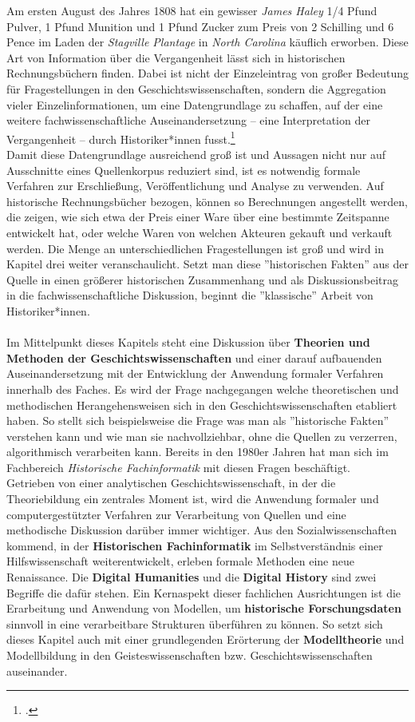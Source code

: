 \documentclass[12pt,a4paper]{article}
\begin{document}
Am ersten August des Jahres 1808 hat ein gewisser \textit{James Haley} 1/4 Pfund Pulver, 1 Pfund Munition und 1 Pfund Zucker zum Preis von 2 Schilling und 6 Pence im Laden der \textit{Stagville Plantage} in \textit{North Carolina} käuflich erworben. Diese Art von Information über die Vergangenheit lässt sich in historischen Rechnungsbüchern finden. Dabei ist nicht der Einzeleintrag von großer Bedeutung für Fragestellungen in den Geschichtswissenschaften, sondern die Aggregation vieler Einzelinformationen, um eine Datengrundlage zu schaffen, auf der eine weitere fachwissenschaftliche Auseinandersetzung -- eine Interpretation der Vergangenheit -- durch Historiker*innen fusst.\footcite[][06.06.2019]{vogeler2015mittelalterliche}
\\
Damit diese Datengrundlage ausreichend groß ist und Aussagen nicht nur auf Ausschnitte eines Quellenkorpus reduziert sind, ist es notwendig formale Verfahren zur Erschließung, Veröffentlichung und Analyse zu verwenden. Auf historische Rechnungsbücher bezogen, können so Berechnungen angestellt werden, die zeigen, wie sich etwa der Preis einer Ware über eine bestimmte Zeitspanne entwickelt hat, oder welche Waren von welchen Akteuren gekauft und verkauft werden. Die Menge an unterschiedlichen Fragestellungen ist groß und wird in Kapitel drei weiter veranschaulicht. Setzt man diese ''historischen Fakten'' aus der Quelle in einen größerer historischen Zusammenhang und als Diskussionsbeitrag in die fachwissenschaftliche Diskussion, beginnt die ''klassische'' Arbeit von Historiker*innen. 
\\
\\
Im Mittelpunkt dieses Kapitels steht eine Diskussion über \textbf{Theorien und Methoden der Geschichtswissenschaften} und einer darauf aufbauenden Auseinandersetzung mit der Entwicklung der Anwendung formaler Verfahren innerhalb des Faches. Es wird der Frage nachgegangen welche theoretischen und methodischen Herangehensweisen sich in den Geschichtswissenschaften etabliert haben. So stellt sich beispielsweise die Frage was man als ''historische Fakten'' verstehen kann und wie man sie nachvollziehbar, ohne die Quellen zu verzerren, algorithmisch verarbeiten kann. Bereits in den 1980er Jahren hat man sich im Fachbereich \textit{Historische Fachinformatik} mit diesen Fragen beschäftigt.
\\
Getrieben von einer analytischen Geschichtswissenschaft, in der die Theoriebildung ein zentrales Moment ist, wird die Anwendung formaler und computergestützter Verfahren zur Verarbeitung von Quellen und eine methodische Diskussion darüber immer wichtiger. Aus den Sozialwissenschaften kommend, in der \textbf{Historischen Fachinformatik} im Selbstverständnis einer Hilfswissenschaft weiterentwickelt, erleben formale Methoden eine neue Renaissance. Die \textbf{Digital Humanities} und die \textbf{Digital History} sind zwei Begriffe die dafür stehen. Ein Kernaspekt dieser fachlichen Ausrichtungen ist die Erarbeitung und Anwendung von Modellen, um \textbf{historische Forschungsdaten} sinnvoll in eine verarbeitbare Strukturen überführen zu können. So setzt sich dieses Kapitel auch mit einer grundlegenden Erörterung der \textbf{Modelltheorie} und Modellbildung in den Geisteswissenschaften bzw. Geschichtswissenschaften auseinander.
\end{document}
